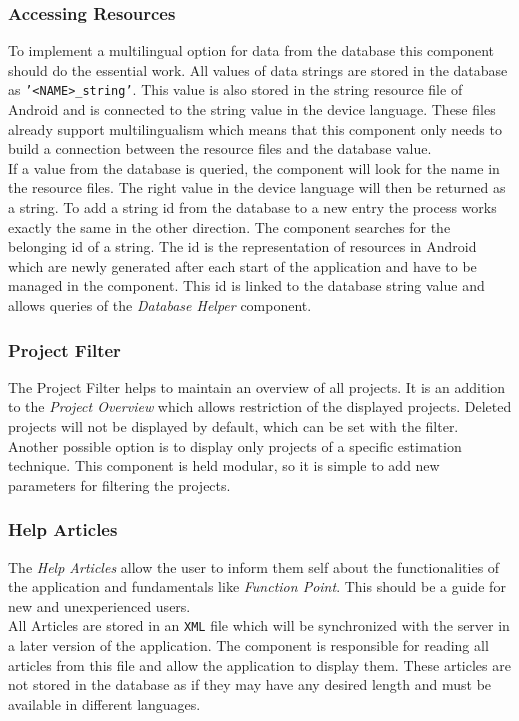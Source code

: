 \subsubsection{\textbf{Accessing Resources}}\label{accessingresources}

To implement a multilingual option for data from the database this component should do the essential work. All values of data strings are stored in the database as \texttt{'<NAME>\_string'}. This value is also stored in the string resource file of Android and is connected to the string value in the device language. These files already support multilingualism which means that this component only needs to build a connection between the resource files and the database value.\\
If a value from the database is queried, the component will look for the name in the resource files. The right value in the device language will then be returned as a string. To add a string id from the database to a new entry the process works exactly the same in the other direction. The component searches for the belonging id of a string. The id is the representation of resources in Android which are newly generated after each start of the application and have to be managed in the component. This id is linked to the database string value and allows queries of the \textit{Database Helper} component. 

\subsubsection{\textbf{Project Filter}}

The Project Filter helps to maintain an overview of all projects. It is an addition to the \textit{Project Overview} which allows restriction of the displayed projects. Deleted projects will not be displayed by default, which can be set with the filter. Another possible option is to display only projects of a specific estimation technique. This component is held modular, so it is simple to add new parameters for filtering the projects. 

\subsubsection{\textbf{Help Articles}}

The \textit{Help Articles} allow the user to inform them self about the functionalities of the application and fundamentals like \textit{Function Point}. This should be a guide for new and unexperienced users.\\
All Articles are stored in an \texttt{XML} file which will be synchronized with the server in a later version of the application. The component is responsible for reading all articles from this file and allow the application to display them. These articles are not stored in the database as if they may have any desired length and must be available in different languages. 
 
